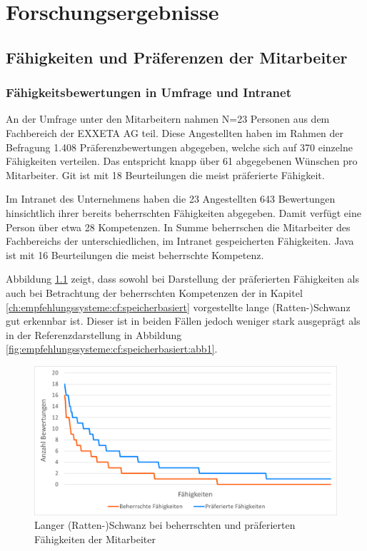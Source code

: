 \chapter{Forschungsergebnisse}
\label{ch:ergebnisse}

\section{Fähigkeiten und Präferenzen der Mitarbeiter}
\label{ch:ergebnisse:analyse}

\subsection{Fähigkeitsbewertungen in Umfrage und Intranet}
\label{ch:ergebnisse:analyse:intranetUndUmfrage}
An der Umfrage unter den Mitarbeitern nahmen N=23 Personen aus dem Fachbereich \JES der EXXETA AG teil. Diese Angestellten haben im Rahmen der Befragung 1.408 Präferenzbewertungen abgegeben, welche sich auf 370 einzelne Fähigkeiten verteilen. Das entspricht knapp über 61 abgegebenen Wünschen pro Mitarbeiter. Git ist mit 18 Beurteilungen die meist präferierte Fähigkeit.

Im Intranet des Unternehmens haben die 23 Angestellten 643 Bewertungen hinsichtlich ihrer bereits beherrschten Fähigkeiten abgegeben. Damit verfügt eine Person über etwa 28 Kompetenzen. In Summe beherrschen die Mitarbeiter des Fachbereichs  der \anzFaehigkeiten unterschiedlichen, im Intranet gespeicherten Fähigkeiten. Java ist mit 16 Beurteilungen die meist beherrschte Kompetenz.

Abbildung \ref{fig:ergebnisse:analyse:abb1} zeigt, dass sowohl bei Darstellung der präferierten Fähigkeiten als auch bei Betrachtung der beherrschten Kompetenzen der in Kapitel \ref{ch:empfehlungssysteme:cf:speicherbasiert} vorgestellte lange (Ratten-)Schwanz gut erkennbar ist. Dieser ist in beiden Fällen jedoch weniger stark ausgeprägt als in der Referenzdarstellung in Abbildung \ref{fig:empfehlungssysteme:cf:speicherbasiert:abb1}.

\begin{figure}[h]
	\centering
	\includegraphics[width=1\textwidth]{gfx/long-tail-insgesamt.png}
	\caption{Langer (Ratten-)Schwanz bei beherrschten und präferierten Fähigkeiten der Mitarbeiter}
	\label{fig:ergebnisse:analyse:abb1}
\end{figure}

